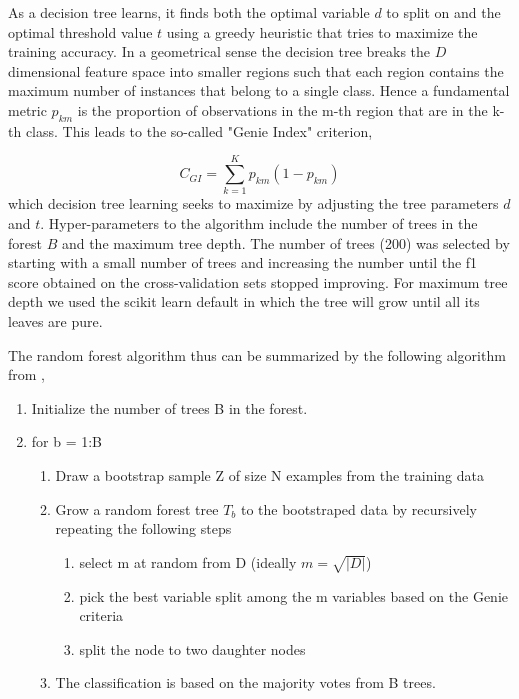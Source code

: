 \documentclass[proposal]{umassthesis}
\begin{document}
As a decision tree learns, it finds both the optimal variable $d$ to split on and the optimal threshold value $t$ using a greedy heuristic that tries to maximize the training accuracy. In a geometrical sense the decision tree breaks the $D$ dimensional feature space into smaller regions such that each region contains the maximum number of instances that belong to a single class. Hence a fundamental metric $p_{km}$ is the proportion of observations in the m-th region that are in the k-th class. This leads to the so-called "Genie Index" criterion,

\begin{equation}
C_{GI} =  \sum_{k=1}^{K} p_{km} (1 - p_{km})
\end{equation}
which decision tree learning seeks to maximize by adjusting the tree parameters $d$ and $t$. Hyper-parameters to the algorithm include the number of trees in the forest $B$ and the maximum tree depth. The number of trees (200) was selected by starting with a small number of trees and increasing the number until the f1 score obtained on the cross-validation sets stopped improving. For maximum tree depth we used the scikit learn default in which the tree will grow until all its leaves are pure\cite{pedregosa2011scikit}.

The random forest algorithm thus can be summarized by the following algorithm from \cite{friedman2001elements},
 
\begin{enumerate}
\item Initialize the number of trees B in the forest. 
\item for b = 1:B
\begin{enumerate}
\item Draw a bootstrap sample Z of size N examples from the training data
\item Grow a random forest tree $T_b$ to the bootstraped data by recursively repeating the following steps
\begin{enumerate}
\item select m at random from D (ideally $m = \sqrt{|D|}$)
\item pick the best variable split among the m variables based on the Genie criteria
\item split the node to two daughter nodes
\end{enumerate}
\item The classification is based on the majority votes from B trees. 
\end{enumerate}
\end{enumerate}
\end{document}
